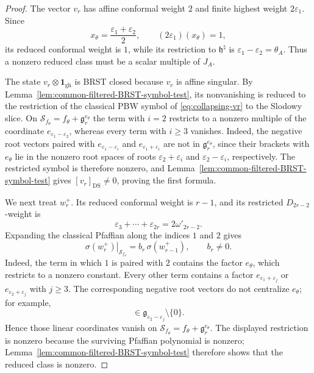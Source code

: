\documentclass[11pt,reqno]{amsart}
\theoremstyle{definition}
\theoremstyle{remark}
\begin{document}
\begin{proof}
The vector $v_r$ has affine conformal weight $2$ and finite highest weight
$2\varepsilon_1$.  Since
\begin{equation*}
  x_\theta=\frac{\varepsilon_1+\varepsilon_2}{2},
  \qquad
  (2\varepsilon_1)(x_\theta)=1,
\end{equation*}
its reduced conformal weight is $1$, while its restriction to
$\mathfrak h^\natural$ is
$\varepsilon_1-\varepsilon_2=\theta_A$.  Thus a nonzero reduced class must
be a scalar multiple of $J_A$.

The state $v_r\otimes\mathbf1_{\mathrm{gh}}$ is BRST closed because
$v_r$ is affine singular.  By
Lemma~\ref{lem:common-filtered-BRST-symbol-test}, its nonvanishing is reduced
to the restriction of the classical PBW symbol of
\eqref{eq:collapsing-vr} to the Slodowy slice.  On
$\mathcal S_{f_\theta}=f_\theta+\mathfrak g_r^{e_\theta}$ the term with
$i=2$ restricts to a nonzero multiple of the coordinate
$e_{\varepsilon_1-\varepsilon_2}$, whereas every term with $i\ge3$
vanishes.  Indeed, the negative root vectors paired with
$e_{\varepsilon_1-\varepsilon_i}$ and
$e_{\varepsilon_1+\varepsilon_i}$ are not in
$\mathfrak g_r^{e_\theta}$, since their brackets with $e_\theta$ lie in
the nonzero root spaces of roots $\varepsilon_2+\varepsilon_i$ and
$\varepsilon_2-\varepsilon_i$, respectively.  The restricted symbol is therefore nonzero, and
Lemma~\ref{lem:common-filtered-BRST-symbol-test} gives
$[v_r]_{\mathrm{DS}}\ne0$, proving the first formula.

We next treat $w_r^+$.  Its reduced conformal weight is $r-1$, and its
restricted $D_{2r-2}$-weight is
\begin{equation*}
  \varepsilon_3+\cdots+\varepsilon_{2r}
  =2\omega'_{2r-2}.
\end{equation*}
Expanding the classical Pfaffian along the indices $1$ and $2$ gives
\begin{equation*}
  \left.\sigma(w_r^+)\right|_{\mathcal S_{f_\theta}}
  =b_r\,\sigma(w_{r-1}^+),
  \qquad
  b_r\ne0.
\end{equation*}
Indeed, the term in which $1$ is paired with $2$ contains the factor
$e_\theta$, which restricts to a nonzero constant.  Every other term
contains a factor $e_{\varepsilon_1+\varepsilon_j}$ or
$e_{\varepsilon_2+\varepsilon_j}$ with $j\ge3$.  The corresponding
negative root vectors do not centralize $e_\theta$; for example,
\begin{equation*}
 [e_\theta,e_{-\varepsilon_1-\varepsilon_j}]
 \in\mathfrak g_{\varepsilon_2-\varepsilon_j}\setminus\{0\}.
\end{equation*}
Hence those linear coordinates vanish on
$\mathcal S_{f_\theta}=f_\theta+\mathfrak g_r^{e_\theta}$.  The displayed
restriction is nonzero because the surviving Pfaffian polynomial is nonzero;
Lemma~\ref{lem:common-filtered-BRST-symbol-test} therefore shows that the
reduced class is nonzero.


\end{proof}
\end{document}
